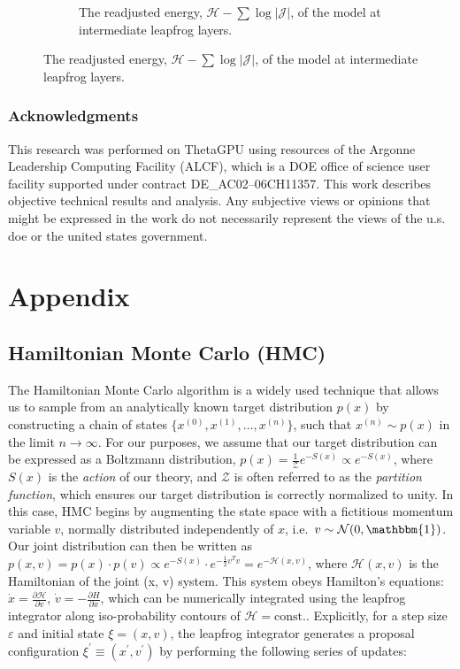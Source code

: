 \documentclass{article} %
\begin{document}
\begin{figure}[htpb]
\begin{subfigure}{0.31\textwidth}
      \caption{The readjusted energy, \(\mathcal{H}-\sum\log|\mathcal{J}|\), of the model at intermediate leapfrog layers.}
   \end{subfigure}
   
\end{figure}
%

\subsubsection*{Acknowledgments}
This research was performed on ThetaGPU using resources of the Argonne Leadership Computing Facility (ALCF), which is a DOE office of science user
facility supported under contract DE\_AC02--06CH11357.%
%
This work describes objective technical results and analysis.
%
Any subjective views or opinions that might be expressed in the work do not necessarily represent the views of the u.s.
doe or the united states government.




\appendix
\section{Appendix}
%
\subsection{\label{subsec:HMC}Hamiltonian Monte Carlo (HMC)}
%
The Hamiltonian Monte Carlo algorithm is a widely used technique that allows us to sample from an analytically known
target distribution \(p(x)\) by constructing a chain of states \(\{x^{(0)}, x^{(1)}, \ldots, x^{(n)}\}\), such that
\(x^{(n)}\sim p(x)\) in the limit \(n\rightarrow\infty\).
%
For our purposes, we assume that our target distribution can be expressed as a Boltzmann distribution, \(p(x) =
\tfrac{1}{\mathcal{Z}} e^{-S(x)}\propto e^{-S(x)}\), where \(S(x)\) is the \emph{action} of our theory, and
\(\mathcal{Z}\) is often referred to as the \emph{partition function}, which ensures our target distribution is
correctly normalized to unity.
%
In this case, HMC begins by augmenting the state space with a fictitious momentum variable \(v\), normally
distributed independently of \(x\), i.e.\ \(v\sim\mathcal{N}(0, \mathbbm{1})\).
%
Our joint distribution can then be written as \(%
   p(x, v) = p(x)\cdot p(v) \propto e^{-S(x)}\cdot e^{-\frac{1}{2}v^{T}v} = e^{-\mathcal{H}(x, v)}
\), where \(\mathcal{H}(x, v)\) is the Hamiltonian of the joint (x, v) system.
%
This system obeys Hamilton's equations: %
\(\dot{x} = \frac{\partial\mathcal{H}}{\partial v}\), \(\dot{v} = -\frac{\partial H}{\partial x}\), which can be 
numerically integrated using the leapfrog integrator along iso-probability contours of \(\mathcal{H} = \text{const.}\).
%
Explicitly, for a step size \(\varepsilon\) and initial state \(\xi = (x, v)\), the leapfrog integrator generates a
proposal configuration \(\xi^{\prime} \equiv (x^{\prime}, v^{\prime})\) by performing the following series of updates: 
%
\end{document}
